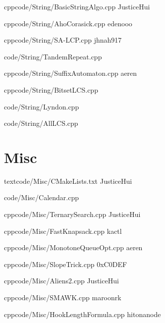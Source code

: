 \documentclass[landscape, 8pt, a4paper, oneside]{extarticle}
\begin{document}
\begin{multicols*}{3}
{}{}
{cpp}{code/String/BasicStringAlgo.cpp}
{JusticeHui}

{}{}
{cpp}{code/String/AhoCorasick.cpp}
{edenooo}

{}{}
{cpp}{code/String/SA-LCP.cpp}
{jhnah917}

{code/String/TandemRepeat.cpp}

{}{}
{cpp}{code/String/SuffixAutomaton.cpp}
{aeren}

{}{}
{cpp}{code/String/BitsetLCS.cpp}

{code/String/Lyndon.cpp}

{code/String/AllLCS.cpp}

\section{Misc}

{}{}
{text}{code/Misc/CMakeLists.txt}
{JusticeHui}

{code/Misc/Calendar.cpp}

{}{}
{cpp}{code/Misc/TernarySearch.cpp}
{JusticeHui}


{}{}
{cpp}{code/Misc/FastKnapsack.cpp}
{kactl}

{}{}
{cpp}{code/Misc/MonotoneQueueOpt.cpp}
{aeren}

{}{}
{cpp}{code/Misc/SlopeTrick.cpp}
{0xC0DEF}

{}{}
{cpp}{code/Misc/Aliens2.cpp}
{JusticeHui}

{}{}
{cpp}{code/Misc/SMAWK.cpp}
{maroonrk}



{}{}
{cpp}{code/Misc/HookLengthFormula.cpp}
{hitonanode}


\end{multicols*}
\end{document}
